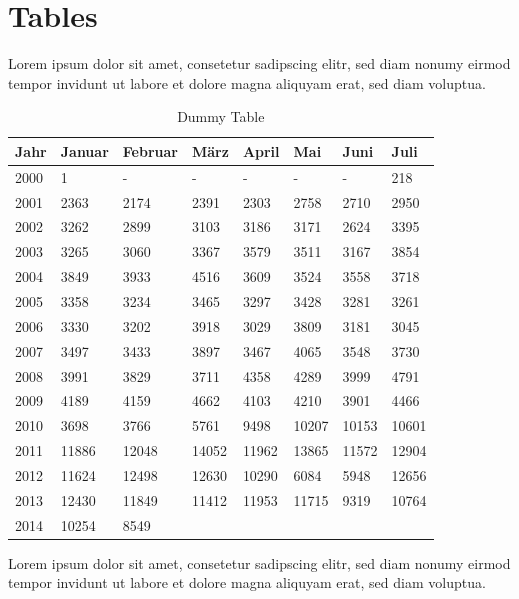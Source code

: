 \documentclass[
        ngerman,
        paper=a4,
        numbers=noendperiod,
]{scrreprt}
\begin{document}
\section{Tables}
Lorem ipsum dolor sit amet, consetetur sadipscing elitr, sed diam nonumy eirmod tempor invidunt ut labore et dolore magna aliquyam erat, sed diam voluptua.
\begin{table}[H]
{\small
   \begin{tabularx}{\textwidth}{X|X|X|X|X|X|X|X}
Jahr &  Januar &	Februar &	März & 	April & Mai & Juni & Juli\\ \toprule
    2000      &1      &-       &-       &-         &-       &-  &218\\
    2001      &2363      &2174      &2391    &2303      &2758      & 2710	&2950\\ 
    2002      &3262      &2899      &3103    &3186      &3171      &2624	&3395\\ 
    2003      &3265      &3060      &3367    &3579      &3511      &3167	&3854\\ 
    2004      &3849      &3933      &4516    &3609      &3524      &3558	&3718\\ 
    2005      &3358      &3234      &3465    &3297      &3428      &3281	&3261\\ 
    2006      &3330      &3202      &3918    &3029      &3809      &3181	&3045\\ 
    2007      &3497      &3433      &3897    &3467      &4065      &3548	&3730\\ 
    2008      &3991      &3829      &3711    &4358      &4289      &3999	&4791\\ 
    2009      &4189      &4159      &4662    &4103      &4210      &3901	&4466\\ 
    2010      &3698      &3766      &5761    &9498      &10207    &10153	&10601\\ 
    2011      &11886      &12048      &14052    &11962      &13865      &11572	&12904\\ 
    2012      &11624      &12498      &12630    &10290      &6084      &5948	&12656\\ 
    2013      &12430     &11849      &11412    &11953      &11715      &9319&10764\\ 
    2014      &10254      &8549      &    &     &      & & \\ 
  \end{tabularx}
\caption{Dummy Table}
    \label{tab:tab1}
}
\end{table}
Lorem ipsum dolor sit amet, consetetur sadipscing elitr, sed diam nonumy eirmod tempor invidunt ut labore et dolore magna aliquyam erat, sed diam voluptua.
\end{document}
